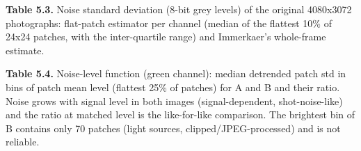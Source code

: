 \documentclass[10pt,a4paper]{article}
\begin{document}
\begin{table}[H]\centering\footnotesize{\small\textbf{Table 5.3.} Noise standard deviation (8-bit grey levels) of the original 4080x3072 photographs: flat-patch estimator per channel (median of the flattest 10\% of 24x24 patches, with the inter-quartile range) and Immerkaer's whole-frame estimate.\par}\vskip 3pt
\end{table}
\begin{table}[H]\centering\footnotesize{\small\textbf{Table 5.4.} Noise-level function (green channel): median detrended patch std in bins of patch mean level (flattest 25\% of patches) for A and B and their ratio. Noise grows with signal level in both images (signal-dependent, shot-noise-like) and the ratio at matched level is the like-for-like comparison. The brightest bin of B contains only 70 patches (light sources, clipped/JPEG-processed) and is not reliable.\par}\vskip 3pt
\end{table}
\end{document}
